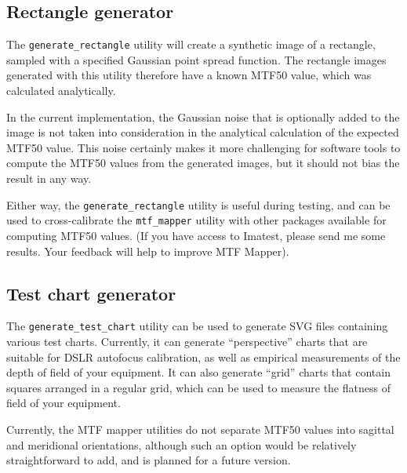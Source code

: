 \documentclass[a4paper]{article}
\begin{document}
\subsection{Rectangle generator}
\label{sec:rectangle_generator}
The \texttt{generate\_rectangle} utility will create a synthetic image of a
rectangle, sampled with a specified Gaussian point spread function. The
rectangle images generated with this utility therefore have a known MTF50
value, which was calculated analytically.

In the current implementation, the Gaussian noise that is optionally added
to the image is not taken into consideration in the analytical calculation
of the expected MTF50 value. This noise certainly makes it more challenging
for software tools to compute the MTF50 values from the generated images,
but it should not bias the result in any way. 

Either way, the \texttt{generate\_rectangle} utility is useful during
testing, and can be used to cross-calibrate the \texttt{mtf\_mapper} utility
with other packages available for computing MTF50 values. (If you have
access to Imatest, please send me some results. Your feedback will help to
improve MTF Mapper).

\subsection{Test chart generator}
The \texttt{generate\_test\_chart} utility can be used to generate SVG files
containing various test charts. Currently, it can generate ``perspective''
charts that are suitable for DSLR autofocus calibration, as well as
empirical measurements of the depth of field of your equipment. It can also
generate ``grid'' charts that contain squares arranged in a regular grid,
which can be used to measure the flatness of field of your
equipment.

Currently, the MTF mapper utilities do not separate MTF50 values into
sagittal and meridional orientations, although such an option would be
relatively straightforward to add, and is planned for a future version.
\end{document}
